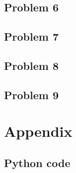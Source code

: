 \documentclass{article}
\begin{document}
\subsection*{Problem 6}


\subsection*{Problem 7}

\subsection*{Problem 8}

\subsection*{Problem 9}

\section*{Appendix}

\subsection*{Python code}
\hypertarget{pythonsourcecode}{}

\end{document}
